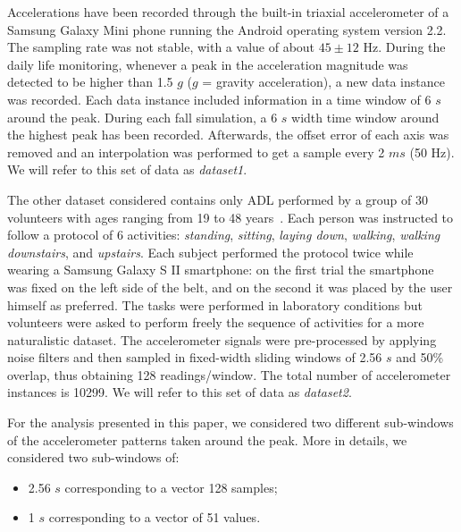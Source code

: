 \documentclass[twocolumn]{svjour3}          \smartqed  \usepackage[draft]{hyperref}
\begin{document}
Accelerations have been recorded through the
built-in triaxial accelerometer of a Samsung Galaxy Mini phone
running the Android operating system version 2.2. The sampling
rate was not stable, with a value of about $45\pm12$ Hz. During the daily life monitoring,
whenever a peak in the acceleration magnitude was detected to be
higher than 1.5 $g$ ($g$ = gravity acceleration), a new data instance was recorded. Each data instance included information in a time window of 6 $s$ around the peak.
During each fall simulation, a 6 $s$ width time window
around the highest peak has been recorded. Afterwards, the offset error of each axis was removed and an interpolation was performed to get a sample every 2 $ms$ (50 Hz). We will refer to this set of data as \emph{dataset1}.

The other dataset considered contains only ADL performed by a group of 30 volunteers with ages ranging from 19 to 48 years~\citep{anguita2013public}. Each person was instructed to follow a protocol of 6 activities: \emph{standing}, \emph{sitting}, \emph{laying down}, \emph{walking}, \emph{walking downstairs}, and \emph{upstairs}. Each subject performed the protocol twice while wearing a Samsung Galaxy S II smartphone: on the first trial the smartphone was fixed on the left side of the belt, and on the second it was placed by the user himself as preferred. The tasks were performed in laboratory conditions but volunteers were asked to perform freely the sequence of activities for a more naturalistic dataset. The accelerometer signals were pre-processed by applying noise filters and then sampled in fixed-width sliding windows of 2.56 $s$ and 50\% overlap, thus obtaining 128 readings/window. The total number of accelerometer instances is 10299. We will refer to this set of data as \emph{dataset2}.

For the analysis presented in this paper, we considered two different sub-windows of the accelerometer patterns taken around  the peak. More in details, we considered two sub-windows of:
\begin{itemize}
\item  2.56 $s$ corresponding to a vector 128 samples;
\item 1 $s$ corresponding to a vector of 51 values.
\end{itemize}
\end{document}
